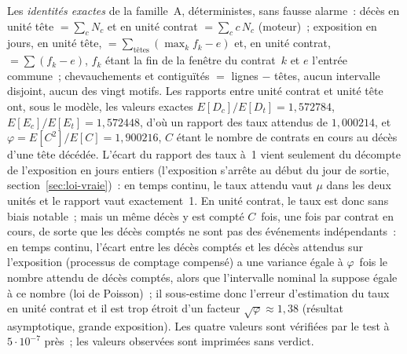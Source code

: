 \documentclass[a4paper,11pt]{article}
\begin{document}
\noindent
Les \emph{identités exactes} de la famille~A, déterministes, sans fausse
alarme~: décès en unité tête $= \sum_c N_c$ et en unité contrat
$= \sum_c c\, N_c$ (moteur)~; exposition en jours, en unité tête,
$= \sum_{\text{têtes}} (\max_k f_k - e)$ et, en unité contrat,
$= \sum (f_k - e)$, $f_k$ étant la fin de la fenêtre du contrat~$k$ et $e$
l'entrée commune~; chevauchements et contiguïtés $=$ lignes $-$ têtes,
aucun intervalle disjoint, aucun des vingt motifs. Les rapports entre unité
contrat et unité tête ont, sous le modèle, les valeurs exactes
$E[D_c]/E[D_t] = 1{,}572784$, $E[E_c]/E[E_t] = 1{,}572448$, d'où un
rapport des taux attendus de $1{,}000214$, et
$\varphi = E[C^{2}]/E[C] = 1{,}900216$, $C$ étant le nombre de contrats en
cours au décès d'une tête décédée. L'écart du rapport des taux à~1 vient
seulement du décompte de l'exposition en jours entiers (l'exposition
s'arrête au début du jour de sortie, section~\ref{sec:loi-vraie})~: en
temps continu, le taux
attendu vaut $\mu$ dans les deux unités et le rapport vaut exactement~1. En
unité contrat, le taux est donc sans biais notable~; mais un même décès y
est compté $C$~fois, une fois par contrat en cours, de sorte que les décès
comptés ne sont pas des événements indépendants~: en temps continu,
l'écart entre les décès comptés et les décès attendus sur l'exposition
(processus de comptage compensé) a une variance égale à $\varphi$~fois le
nombre attendu de décès comptés, alors que l'intervalle nominal la suppose
égale à ce nombre (loi de Poisson)~; il sous-estime donc l'erreur
d'estimation du taux en unité contrat et il est trop étroit d'un facteur
$\sqrt{\varphi} \approx 1{,}38$ (résultat asymptotique, grande
exposition). Les quatre valeurs sont vérifiées par le test à
$5 \cdot 10^{-7}$ près~; les valeurs observées sont imprimées sans
verdict.
\end{document}

